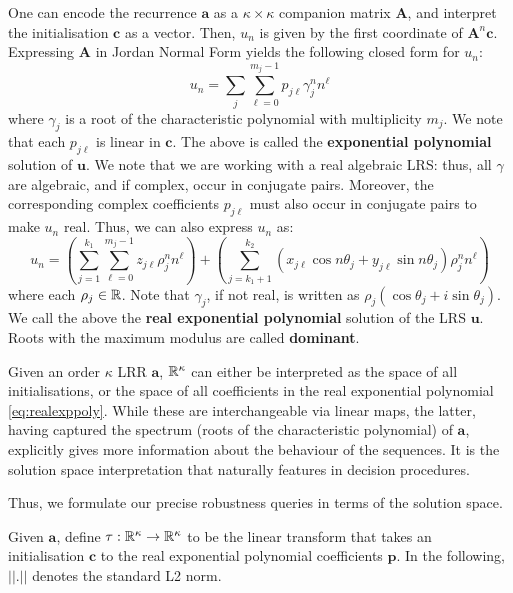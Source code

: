 One can encode the recurrence $\mathbf{a}$ as a $\kappa \times \kappa$ companion matrix $\mathbf{A}$, and interpret the initialisation $\mathbf{c}$ as a vector. Then, $u_n$ is given by the first coordinate of $\mathbf{A}^n\mathbf{c}$. Expressing $\mathbf{A}$ in Jordan Normal Form yields the following closed form for $u_n$:
\begin{equation}
\label{eq:exppoly}
u_n = \sum_{j}\sum_{\ell=0}^{m_j - 1}p_{j\ell}\gamma_j^n n^\ell
\end{equation}
where $\gamma_j$ is a root of the characteristic polynomial with multiplicity $m_j$. We note that each $p_{j\ell}$ is linear in $\mathbf{c}$. The above is called the \textbf{exponential polynomial} solution of $\mathbf{u}$. We note that we are working with a real algebraic LRS: thus, all $\gamma$ are algebraic, and if complex, occur in conjugate pairs. Moreover, the corresponding complex coefficients $p_{j\ell}$ must also occur in conjugate pairs to make $u_n$ real. Thus, we can also express $u_n$ as:
\begin{equation}
\label{eq:realexppoly}
u_n = \left(\sum_{j=1}^{k_1}\sum_{\ell = 0}^{m_j-1} z_{j\ell}\rho_j^n n^\ell\right) + \left(\sum_{j=k_1 + 1}^{k_2}  (x_{j\ell} \cos n\theta_j + y_{j\ell}\sin n\theta_j)\rho_j^n n^\ell\right)
\end{equation}
where each $\rho_j \in \mathbb{R}$. Note that $\gamma_j$, if not real, is written as $\rho_j(\cos \theta_j + i\sin \theta_j)$. We call the above the \textbf{real exponential polynomial} solution of the LRS $\mathbf{u}$. Roots with the maximum modulus are called \textbf{dominant}.

Given an order $\kappa$ LRR $\mathbf{a}$, $\mathbb{R}^\kappa$ can either be interpreted as the space of all initialisations, or the space of all coefficients in the real exponential polynomial \ref{eq:realexppoly}. While these are interchangeable via linear maps, the latter, having captured the spectrum (roots of the characteristic polynomial) of $\mathbf{a}$, explicitly gives more information about the behaviour of the sequences. It is the solution space interpretation that naturally features in decision procedures. 


Thus, we formulate our precise robustness queries in terms of the solution space. 

Given $\mathbf{a}$, define $\tau: \mathbb{R}^\kappa \rightarrow \mathbb{R}^\kappa$ to be the linear transform that takes an initialisation $\mathbf{c}$ to the real exponential polynomial coefficients $\mathbf{p}$. In the following, $||.||$ denotes the standard L2 norm.


